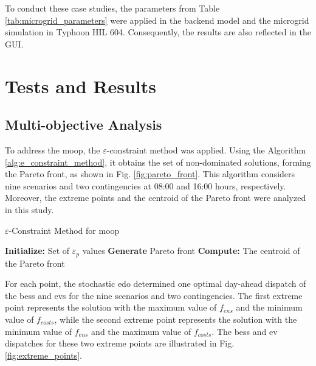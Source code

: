 \documentclass[preprint, 10pt, 5p]{elsarticle}
\begin{document}
To conduct these case studies, the parameters from 
Table \ref{tab:microgrid_parameters} were applied in the backend model and 
the microgrid simulation in 
Typhoon HIL 604. Consequently, the results are also reflected in the GUI.

\section{Tests and Results}\label{sec:tests_results}

\subsection{Multi-objective Analysis}

To address the \gls{moop}, the $\varepsilon$-constraint method was applied.
Using the Algorithm \ref{alg:e_constraint_method}, it obtains the set 
of non-dominated solutions, forming the Pareto front,
as shown in Fig. \ref{fig:pareto_front}. This algorithm considers nine 
scenarios and two contingencies at 08:00 and 16:00 hours, respectively. 
Moreover, the extreme points and the centroid of the Pareto front were 
analyzed in this study.

\begin{algorithm}
    \caption{$\varepsilon$-Constraint Method for \gls{moop}}
    \label{alg:e_constraint_method}
    \SetAlgoLined
    \textbf{Initialize:} 
    Set of $\varepsilon_{p}$ values\;
    \textbf{Generate} Pareto front\;
    \textbf{Compute:} The centroid of the Pareto front\;

\end{algorithm}

For each point, the stochastic \gls{edo}
determined one optimal day-ahead dispatch of the \gls{bess} and \glspl{ev} 
for the nine scenarios and two contingencies.
The first extreme point represents the solution with the maximum value 
of $f_{ens}$ and the minimum value of $f_{costs}$, while the second extreme 
point represents the solution with the minimum value of $f_{ens}$ and the
maximum value of $f_{costs}$. The \gls{bess} and \gls{ev} dispatches for 
these two extreme points are illustrated in Fig. \ref{fig:extreme_points}.
\end{document}
